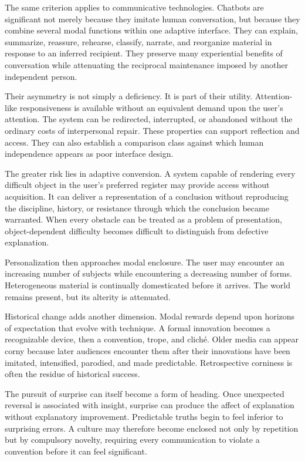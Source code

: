 \documentclass[11pt]{article}
\begin{document}
The same criterion applies to communicative technologies. Chatbots are
significant not merely because they imitate human conversation, but because
they combine several modal functions within one adaptive interface. They can
explain, summarize, reassure, rehearse, classify, narrate, and reorganize
material in response to an inferred recipient. They preserve many experiential
benefits of conversation while attenuating the reciprocal maintenance imposed
by another independent person.

Their asymmetry is not simply a deficiency. It is part of their utility.
Attention-like responsiveness is available without an equivalent demand upon
the user's attention. The system can be redirected, interrupted, or abandoned
without the ordinary costs of interpersonal repair. These properties can
support reflection and access. They can also establish a comparison class
against which human independence appears as poor interface design.

The greater risk lies in adaptive conversion. A system capable of rendering
every difficult object in the user's preferred register may provide access
without acquisition. It can deliver a representation of a conclusion without
reproducing the discipline, history, or resistance through which the
conclusion became warranted. When every obstacle can be treated as a problem
of presentation, object-dependent difficulty becomes difficult to distinguish
from defective explanation.

Personalization then approaches modal enclosure. The user may encounter an
increasing number of subjects while encountering a decreasing number of
forms. Heterogeneous material is continually domesticated before it arrives.
The world remains present, but its alterity is attenuated.

Historical change adds another dimension. Modal rewards depend upon horizons
of expectation that evolve with technique. A formal innovation becomes a
recognizable device, then a convention, trope, and cliché. Older media can
appear corny because later audiences encounter them after their innovations
have been imitated, intensified, parodied, and made predictable. Retrospective
corniness is often the residue of historical success.

The pursuit of surprise can itself become a form of heading. Once unexpected
reversal is associated with insight, surprise can produce the affect of
explanation without explanatory improvement. Predictable truths begin to feel
inferior to surprising errors. A culture may therefore become enclosed not
only by repetition but by compulsory novelty, requiring every communication
to violate a convention before it can feel significant.
\end{document}
